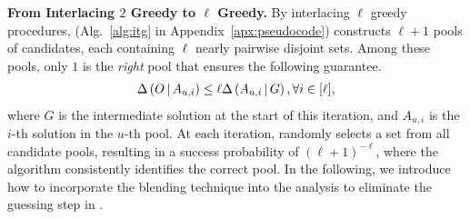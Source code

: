 \textbf{From Interlacing $2$ Greedy to $\ell$ Greedy.}
%
%
By interlacing $\ell$ greedy procedures, \itg 
(Alg.~\ref{alg:itg} in Appendix~\ref{apx:pseudocode}) constructs 
$\ell+1$ pools of candidates, each containing $\ell$ nearly pairwise disjoint sets.
Among these pools, only $1$ is the \textit{right} pool that ensures the following guarantee.
\begin{align}
    \Delta \left( O \, \middle| \, A_{u, i} \right) \le \ell\Delta \left( A_{u, i} \, \middle| \, G \right), \forall i \in [\ell],\label{inq:gdtwo-itg}
\end{align}
where $G$ is the intermediate solution at the start of this iteration,
and $A_{u,i}$ is the $i$-th solution in the $u$-th pool.
At each iteration, \itg randomly selects a set from all candidate pools,
resulting in a success probability of $(\ell+1)^{-\ell}$,
where the algorithm consistently identifies the correct pool.
In the following, we introduce how to incorporate the blending technique
into the analysis to eliminate the guessing step in \itg.

